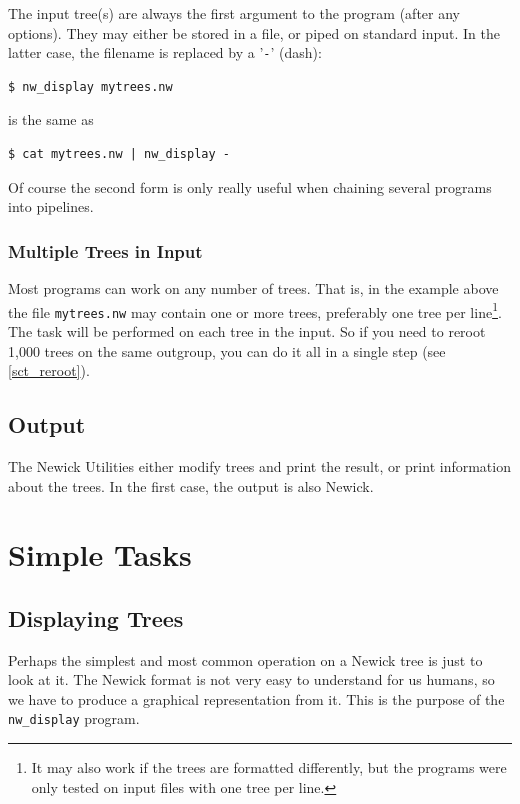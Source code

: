 \documentclass[a4paper,10pt]{report}
\newcommand{\nutils}{Newick Utilities}
\newcommand{\stdin}{standard input}
\newcommand{\nw}{Newick}
\newcommand{\display}{\texttt{nw\_display}}
\theoremstyle{definition}
\begin{document}
The input tree(s) are always the first argument to the program (after any options). They may either be stored in a file, or piped on \stdin{}. In the latter case, the filename is replaced by a '\texttt{-}' (dash):

\begin{samepage}
\begin{verbatim}
$ nw_display mytrees.nw
\end{verbatim}
is the same as
\begin{verbatim}
$ cat mytrees.nw | nw_display -
\end{verbatim}
\end{samepage}
Of course the second form is only really useful when chaining several programs into pipelines.

\subsection{Multiple Trees in Input}

Most programs can work on any number of trees. That is, in the example above the file \texttt{mytrees.nw} may contain one or more trees, preferably one tree per line\footnote{It may also work if the trees are formatted differently, but the programs were only tested on input files with one tree per line.}. The task will be performed on each tree in the input. So if you need to reroot 1,000 trees on the same outgroup, you can do it all in a single step (see \ref{sct_reroot}).

\section{Output}
\label{sect_output}

The \nutils{} either modify trees and print the result, or print information about the trees. In the first case, the output is also Newick.

\chapter{Simple Tasks}
\label{chap_simple}

\section{Displaying Trees}
\label{sct_display}

Perhaps the simplest and most common operation on a \nw{} tree is just to look at it. The \nw{} format is not very easy to understand for us humans, so we have to produce a graphical representation from it. This is the purpose of the \display{} program. 
\end{document}
